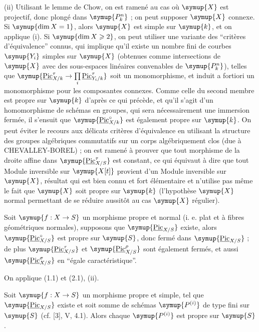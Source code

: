 (ii) Utilisant le lemme de Chow, on est ramené au cas où $\symup{X}$ est projectif,
donc plongé dans $\symup{P_k^n}$ ; on peut supposer $\symup{X}$ connexe. Si
$\symup{\dim X=1}$, alors $\symup{X}$ est simple sur $\symup{k}$, et on applique (i). Si $\symup{\dim X\geqslant2}$,
on peut utiliser une variante des ``critères d'équivalence'' connus, qui
implique qu'il existe un nombre fini de courbes $\symup{Y_i}$ simples sur $\symup{X}$ (obtenues
comme intersections de $\symup{X}$ avec des sous-espaces linéaires convenables de
$\symup{P_k^n}$), telles que $\symup{\underline{\operatorname{Pic}}_{X/k}^\tau\to\prod\limits_i\underline{\operatorname{Pic}}_{Y_i/k}^\tau}$ soit un monomorphisme, et induit a fortiori un monomorphisme pour les
composantes connexes. Comme celle du second membre est propre sur $\symup{k}$ d'après
ce qui précède, et qu'il s'agit d'un homomorphisme de schémas en groupes, qui
sera nécessairement une immersion fermée, il s'ensuit que
$\symup{\underline{\operatorname{Pic}}_{X/k}^\circ}$ est également propre sur $\symup{k}$. On peut éviter
le recours aux délicats critères d'équivalence en utilisant la structure des
groupes algébriques commutatifs sur un corps algébriquement clos (due à
CHEVALLEY-BOREL) ; on est ramené à prouver que tout morphisme de la droite
affine dans $\symup{\underline{\operatorname{Pic}}_{X/S}^\tau}$ est constant, ce qui
équivaut à dire que tout Module inversible sur
$\symup{X[t]}$ provient d'un Module inversible sur $\symup{X}$, résultat qui
est bien connu et fort élémentaire et n'utilise pas même le fait que $\symup{X}$ soit
propre sur $\symup{k}$ (l'hypothèse $\symup{X}$ normal permettant de se réduire aussitôt au cas
$\symup{X}$ régulier).

 Soit $\symup{f:X\to S}$ un morphisme propre et
normal (i. e. plat et à fibres géométriques normales), supposons que
$\symup{\underline{\operatorname{Pic}}_{X/S}}$ existe, alors $\symup{\underline{\operatorname{Pic}}_{X/S}^\circ}$ est
propre sur $\symup{S}$, donc fermé dans $\symup{\underline{\operatorname{Pic}}_{X/S}}$ ; de plus
$\symup{\underline{\operatorname{Pic}}_{X/S}^\tau}$ et $\symup{\underline{\operatorname{Pic}}_{X/S}^\rho}$ sont
également fermés, et aussi $\symup{\underline{\operatorname{Pic}}_{X/S}^\sigma}$ en ``égale caractéristique''.

On applique (1.1) et (2.1), (ii).

 Soit $\symup{f:X\to S}$ un morphisme propre et
simple, tel que $\symup{\underline{\operatorname{Pic}}_{X/S}}$ existe et soit somme de schémas
$\symup{P^{(i)}}$ de type fini sur $\symup{S}$ (cf. [3], V, 4.1). Alors chaque $\symup{P^{(i)}}$ est
propre sur $\symup{S}$.

